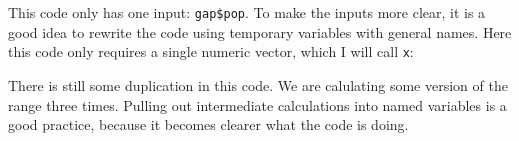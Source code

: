\documentclass[]{book}
\newenvironment{Shaded}{\begin{snugshade}}{\end{snugshade}}
\newcommand{\KeywordTok}[1]{\textcolor[rgb]{0.13,0.29,0.53}{\textbf{#1}}}
\newcommand{\DataTypeTok}[1]{\textcolor[rgb]{0.13,0.29,0.53}{#1}}
\newcommand{\StringTok}[1]{\textcolor[rgb]{0.31,0.60,0.02}{#1}}
\newcommand{\CommentTok}[1]{\textcolor[rgb]{0.56,0.35,0.01}{\textit{#1}}}
\newcommand{\OperatorTok}[1]{\textcolor[rgb]{0.81,0.36,0.00}{\textbf{#1}}}
\newcommand{\NormalTok}[1]{#1}
\begin{document}
\begin{Shaded}
\end{Shaded}

This code only has one input: \texttt{gap\$pop}. To make the inputs more
clear, it is a good idea to rewrite the code using temporary variables
with general names. Here this code only requires a single numeric
vector, which I will call \texttt{x}:

\begin{Shaded}
\end{Shaded}

There is still some duplication in this code. We are calulating some
version of the range three times. Pulling out intermediate calculations
into named variables is a good practice, because it becomes clearer what
the code is doing.
\end{document}
